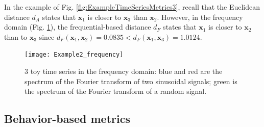 In the example of Fig. \ref{fig:ExampleTimeSeriesMetrics3}, recall that the Euclidean distance $d_A$ states that $\textbf{x}_1$ is closer to $\textbf{x}_3$ than $\textbf{x}_2$. However, in the frequency domain (Fig. \ref{fig:freq}), the frequential-based distance $d_F$ states that $\textbf{x}_1$ is closer to $\textbf{x}_2$ than to $\textbf{x}_3$ since $d_F(\textbf{x}_1,\textbf{x}_2) = 0.0835 < d_F(\textbf{x}_1,\textbf{x}_3) = 1.0124$. 


\begin{figure}[h!]
	\centering
	\texttt{[image: Example2\_frequency]}
	\caption[3 toy time series in the frequency domain]{3 toy time series in the frequency domain: blue and red are the spectrum of the Fourier transform of two sinusoidal signals; green is the spectrum of the Fourier transform of a random signal.}
	\label{fig:freq}
\end{figure}



\subsection{Behavior-based metrics}

